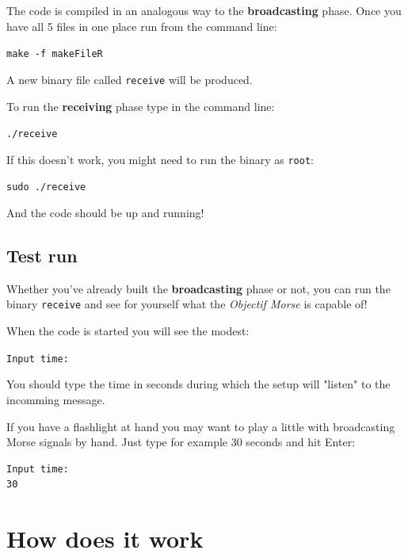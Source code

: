 \documentclass[12pt]{report}
\begin{document}
The code is compiled in an analogous way to the \textbf{broadcasting} phase. Once you have all 5 files in one place run from the command line:

\begin{snugshade}
\verb|make -f makeFileR|
\end{snugshade}

A new binary file called \verb|receive| will be produced.

To run the \textbf{receiving} phase type in the command line:

\begin{snugshade}
\verb|./receive|
\end{snugshade}

If this doesn't work, you might need to run the binary as \verb|root|:

\begin{snugshade}
\verb|sudo ./receive|
\end{snugshade}

And the code should be up and running!

\subsection{Test run}

Whether you've already built the \textbf{broadcasting} phase or not, you can run the binary \verb|receive| and see for yourself what the \textit{Objectif Morse} is capable of!

When the code is started you will see the modest:

\begin{snugshade}
\verb|Input time:|
\end{snugshade}

You should type the time in seconds during which the setup will "listen" to the incomming message.

If you have a flashlight at hand you may want to play a little with broadcasting Morse signals by hand. Just type for example 30 seconds and hit Enter:

\begin{snugshade}
\begin{verbatim}
Input time:
30
\end{verbatim}
\end{snugshade}


\section{How does it work}
\end{document}
